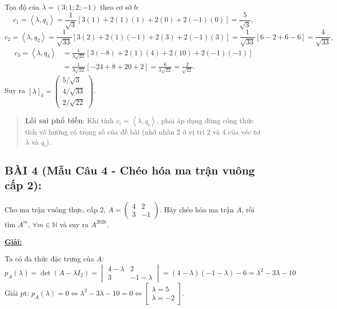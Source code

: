 \documentclass[12pt,a4paper]{article}
\newcommand{\N}{\mathbb{N}}
\newcommand{\ip}[2]{\left\langle #1,#2\right\rangle}
\begin{document}
\vspace{0.2cm}
Tọa độ của $\lambda = (3; 1; 2; -1)$ theo cơ sở $b$:
\[
c_1 = \ip{\lambda}{q_1} = \frac{1}{\sqrt{3}}[3(1) + 2(1)(1) + 2(0) + 2(-1)(0)] = \frac{5}{\sqrt{3}},
\]
\[
c_2 = \ip{\lambda}{q_2} = \frac{1}{\sqrt{33}}[3(2) + 2(1)(-1) + 2(3) + 2(-1)(3)] = \frac{1}{\sqrt{33}}[6 - 2 + 6 - 6] = \frac{4}{\sqrt{33}},
\]
\begin{align*}
c_3 = \ip{\lambda}{q_3} &= \frac{1}{3\sqrt{22}}[3(-8) + 2(1)(4) + 2(10) + 2(-1)(-1)] \\
&= \frac{1}{3\sqrt{22}}[-24 + 8 + 20 + 2] = \frac{6}{3\sqrt{22}} = \frac{2}{\sqrt{22}}.
\end{align*}
Suy ra $[\lambda]_b = \begin{pmatrix} 5/\sqrt{3} \\ 4/\sqrt{33} \\ 2/\sqrt{22} \end{pmatrix}$.

\begin{quote}
\small
\noindent{}\par\vspace{3pt}
\textbf{Lỗi sai phổ biến}: Khi tính $c_i = \ip{\lambda}{q_i}$, phải áp dụng đúng công thức tích vô hướng có trọng số của đề bài (nhớ nhân 2 ở vị trí 2 và 4 của véc tơ $\lambda$ và $q_i$).
\end{quote}


\vspace{0.3cm}

\subsection*{BÀI 4 (Mẫu Câu 4 - Chéo hóa ma trận vuông cấp 2):}
Cho ma trận vuông thực, cấp $2$, $A = \begin{pmatrix} 4 & 2 \\ 3 & -1 \end{pmatrix}$. Hãy chéo hóa ma trận $A$, rồi tìm $A^m$, $\forall m\in\N$ và suy ra $A^{2026}$.

\underline{\textbf{Giải:}}

Ta có đa thức đặc trưng của $A$:
\[
p_A(\lambda) = \det(A - \lambda I_2) = \begin{vmatrix} 4 - \lambda & 2 \\ 3 & -1 - \lambda \end{vmatrix} = (4 - \lambda)(-1 - \lambda) - 6 = \lambda^2 - 3\lambda - 10
\]
Giải pt: $p_A(\lambda) = 0 \Leftrightarrow \lambda^2 - 3\lambda - 10 = 0 \Leftrightarrow \begin{bmatrix} \lambda = 5 \\ \lambda = -2 \end{bmatrix}$.
\end{document}
